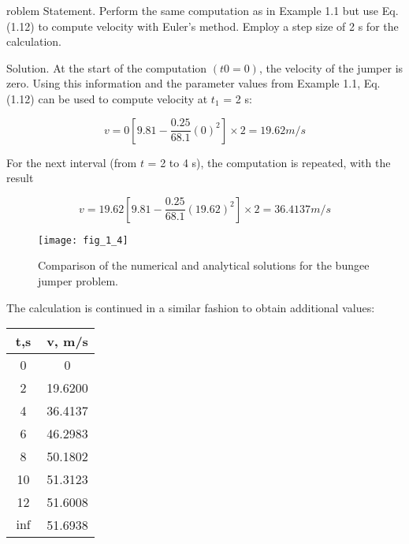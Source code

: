 \documentclass[../main.tex]{subfiles}
\begin{document}
roblem Statement. Perform the same computation as in Example 1.1 but use Eq. (1.12)
to compute velocity with Euler's method. Employ a step size of 2 s for the calculation.

Solution. At the start of the computation $(t0 = 0)$, the velocity of the jumper is zero.
Using this information and the parameter values from Example 1.1, Eq. (1.12) can be used
to compute velocity at $t_1$ = 2 s:

$$ v= 0 \left[ 9.81 - \dfrac{0.25}{68.1}(0)^2 \right] \times 2 = 19.62 m/s$$ 

For the next interval (from $t$ = 2 to 4 s), the computation is repeated, with the result

$$ v= 19.62 \left[ 9.81 - \dfrac{0.25}{68.1}(19.62)^2 \right] \times 2 = 36.4137 m/s$$ 

\begin{figure}[H]
	\centering
	\texttt{[image: fig\_1\_4]}
   \caption{\textsf{Comparison of the numerical and analytical solutions for the bungee jumper problem.}}
   \label{fig_1.4}
\end{figure}


The calculation is continued in a similar fashion to obtain additional values:


\begin{table}[H]
	\begin{tabular}{c c}
		\hline
		\textbf{t,s} & \textbf{v, m/s} \\ 
		\hline
			0 &0\\
			2 &19.6200\\
			4 &36.4137\\
			6& 46.2983\\
			8 &50.1802\\
			10 & 51.3123\\
			12& 51.6008\\
			$\inf$ &51.6938 \\
			\hline
		
	\end{tabular}
\end{table}
\end{document}
